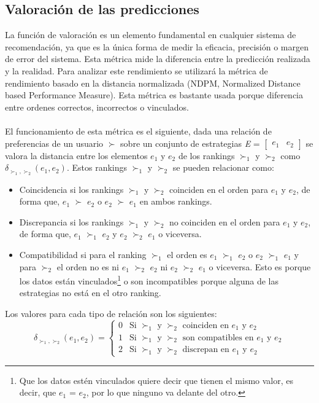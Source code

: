 \subsection{Valoración de las predicciones} \label{Valoracion}
La función de valoración es un elemento fundamental en cualquier sistema de recomendación, ya que es la única forma de medir la eficacia, precisión o margen de error del sistema. Esta métrica mide la diferencia entre  la predicción realizada y la realidad. Para analizar este rendimiento se utilizará la métrica de rendimiento basado en la distancia normalizada (NDPM, Normalized Distance based Performance Measure). Esta métrica es bastante usada porque diferencia entre ordenes correctos, incorrectos o vinculados.
\\ \\
El funcionamiento de esta métrica es el siguiente, dada una relación de preferencias de un usuario $\succ$ sobre un conjunto de estrategias \textit{E} = $\begin{bmatrix} \textit{e$_{1}$} & \textit{e$_{2}$} \end{bmatrix}$ se valora la distancia entre los elementos $e_1$ y $e_2$ de los rankings $\succ_1$ y $\succ_2$ como $\delta_{\succ_1, \succ_2}(e_1, e_2)$. Estos rankings $\succ_1$ y $\succ_2$ se pueden relacionar como:
\begin{itemize}
    \item Coincidencia si los rankings $\succ_1$ y $\succ_2$ coinciden en el orden para $e_1$ y $e_2$, de forma que, $e_1$ $\succ$ $e_2$ o $e_2$ $\succ$ $e_1$ en ambos rankings.
    \item Discrepancia si los rankings $\succ_1$ y $\succ_2$ no coinciden en el orden para $e_1$ y $e_2$, de forma que, $e_1$ $\succ_1$ $e_2$ y $e_2$ $\succ_2$ $e_1$ o viceversa. 
    \item Compatibilidad si para el ranking $\succ_1$ el orden es $e_1$ $\succ_1$ $e_2$ o $e_2$ $\succ_1$ $e_1$ y para $\succ_2$ el orden no es ni $e_1$ $\succ_2$ $e_2$ ni $e_2$ $\succ_2$ $e_1$ o viceversa. Esto es porque los datos están vinculados\footnote{Que los datos estén vinculados quiere decir que tienen el mismo valor, es decir, que $e_1$ = $e_2$, por lo que ninguno va delante del otro.} o son incompatibles porque alguna de las estrategias no está en el otro ranking.   
\end{itemize}
Los valores para cada tipo de relación son los siguientes: 
\[ 
    \delta_{\succ_1, \succ_2}(e_1, e_2) =
    \begin{cases} 
        \mbox{0} & \mbox{Si $\succ_1$ y $\succ_2$ coinciden en $e_1$ y $e_2$} \\
        \mbox{1} & \mbox{Si $\succ_1$ y $\succ_2$ son compatibles en $e_1$ y $e_2$} \\
        \mbox{2} & \mbox{Si $\succ_1$ y $\succ_2$ discrepan en $e_1$ y $e_2$}
    
    \end{cases}
\]
